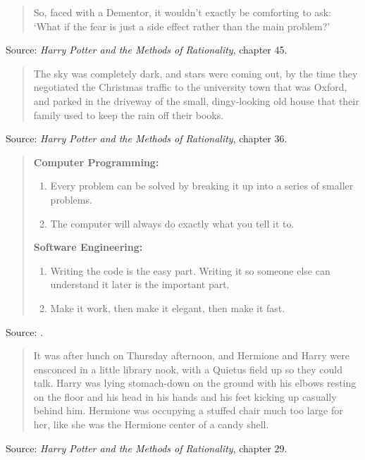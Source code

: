 \documentclass[a4paper]{article}
\begin{document}
\begin{quote}
	So, faced with a Dementor, it wouldn't exactly be comforting
	to ask: `What if the fear is just a side effect rather than the
	main problem?'
\end{quote}
Source: \emph{Harry Potter and the Methods of Rationality}, chapter 45.
\medskip

\begin{quote}
	The sky was completely dark, and stars were coming out, by the
	time they negotiated the Christmas traffic to the university
	town that was Oxford, and parked in the driveway of the small,
	dingy-looking old house that their family used to keep the rain
	off their books.
\end{quote}
Source: \emph{Harry Potter and the Methods of Rationality}, chapter 36.
\medskip

\begin{quote}
	\textbf{Computer Programming:}
	\begin{enumerate}
		\item Every problem can be solved by breaking it up into a
			series of smaller problems.
		\item The computer will always do exactly what you tell it to.
	\end{enumerate}
	\textbf{Software Engineering:}
	\begin{enumerate}
		\item Writing the code is the easy part. Writing it so
			someone else can understand it later is the important part.
		\item Make it work, then make it elegant, then make it fast.
	\end{enumerate}
\end{quote}
Source: \citet{Miller2007}.
\medskip

\begin{quote}
	It was after lunch on Thursday afternoon, and Hermione and
	Harry were ensconced in a little library nook, with a Quietus
	field up so they could talk. Harry was lying stomach-down on the
	ground with his elbows resting on the floor and his head in his
	hands and his feet kicking up casually behind him. Hermione was
	occupying a stuffed chair much too large for her, like she was
	the Hermione center of a candy shell.
\end{quote}
Source: \emph{Harry Potter and the Methods of Rationality}, chapter 29.
\medskip
\end{document}
